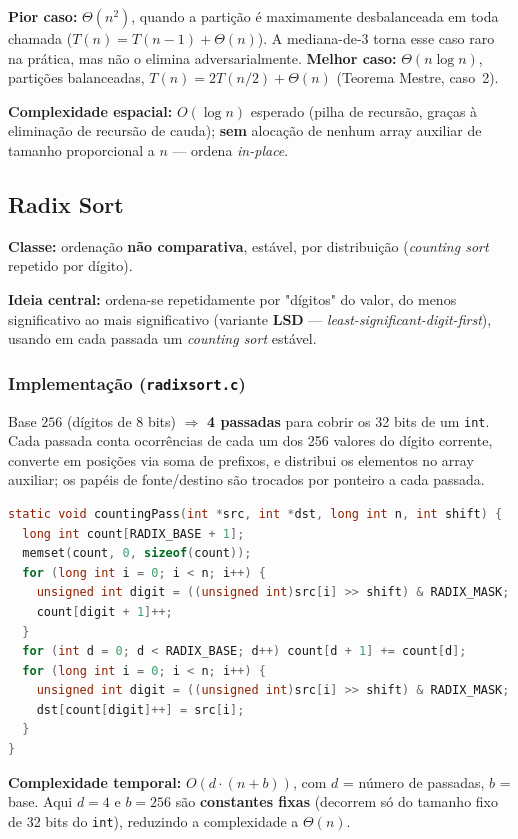 \documentclass[11pt,a4paper]{article}
\renewcommand{\_}{\underscoreoriginal\allowbreak}
\begin{document}
\textbf{Pior caso:} $\Theta(n^2)$, quando a partição é maximamente
desbalanceada em toda chamada ($T(n) = T(n-1) + \Theta(n)$). A
mediana-de-3 torna esse caso raro na prática, mas não o elimina
adversarialmente. \textbf{Melhor caso:} $\Theta(n \log n)$, partições
balanceadas, $T(n) = 2T(n/2) + \Theta(n)$ (Teorema Mestre, caso~2).

\textbf{Complexidade espacial:} $O(\log n)$ esperado (pilha de
recursão, graças à eliminação de recursão de cauda); \textbf{sem}
alocação de nenhum array auxiliar de tamanho proporcional a $n$ ---
ordena \emph{in-place}.

\subsection{Radix Sort}

\textbf{Classe:} ordenação \textbf{não comparativa}, estável, por
distribuição (\emph{counting sort} repetido por dígito).

\textbf{Ideia central:} ordena-se repetidamente por "dígitos" do valor,
do menos significativo ao mais significativo (variante \textbf{LSD} ---
\emph{least-significant-digit-first}), usando em cada passada um
\emph{counting sort} estável.

\subsubsection*{Implementação (\texttt{radixsort.c})}

Base $256$ (dígitos de 8 bits) $\Rightarrow$ \textbf{4 passadas} para
cobrir os 32 bits de um \texttt{int}. Cada passada conta ocorrências de
cada um dos 256 valores do dígito corrente, converte em posições via
soma de prefixos, e distribui os elementos no array auxiliar; os papéis
de fonte/destino são trocados por ponteiro a cada passada.

\begin{lstlisting}[language=C]
static void countingPass(int *src, int *dst, long int n, int shift) {
  long int count[RADIX_BASE + 1];
  memset(count, 0, sizeof(count));
  for (long int i = 0; i < n; i++) {
    unsigned int digit = ((unsigned int)src[i] >> shift) & RADIX_MASK;
    count[digit + 1]++;
  }
  for (int d = 0; d < RADIX_BASE; d++) count[d + 1] += count[d];
  for (long int i = 0; i < n; i++) {
    unsigned int digit = ((unsigned int)src[i] >> shift) & RADIX_MASK;
    dst[count[digit]++] = src[i];
  }
}
\end{lstlisting}

\textbf{Complexidade temporal:} $O(d \cdot (n+b))$, com $d$ = número de
passadas, $b$ = base. Aqui $d=4$ e $b=256$ são \textbf{constantes
fixas} (decorrem só do tamanho fixo de 32 bits do \texttt{int}),
reduzindo a complexidade a $\Theta(n)$.
\end{document}
